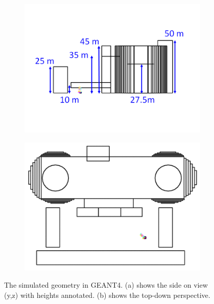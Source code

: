 \begin{figure}[!h]
\centering
\begin{subfigure}{.5\textwidth}
  \centering
  \includegraphics[width=\linewidth]{Chapter5/Figs/wylfaRasterNew/WylfaSimGeomSideOn.png}
  \captionsetup{width=.9\linewidth}
  \caption{}
  \label{subFig:WylfaSimGeomSideOn}
\end{subfigure}%
\begin{subfigure}{.5\textwidth}
  \centering
\includegraphics[width=\linewidth]{Chapter5/Figs/wylfaRasterNew/WylfaSimGeomTopDown.png}
  \captionsetup{width=.9\linewidth}
  \caption{}
  \label{subFig:WylfaSimGeomTopDown}
\end{subfigure}
\caption{The simulated geometry in GEANT4. (a) shows the side on view (y,z) with heights annotated. (b) shows the top-down perspective.}
\label{fig:WylfaSimGeom_SideOn_TopDown}
\end{figure}

